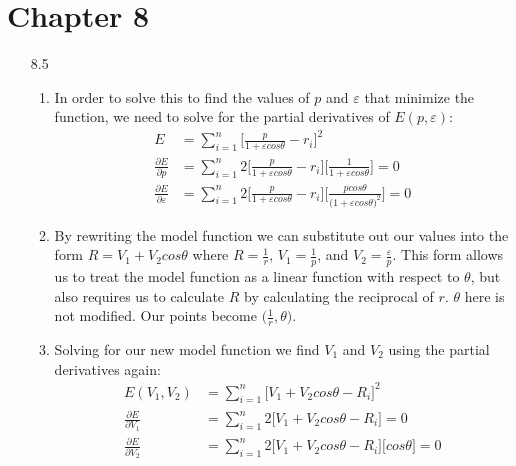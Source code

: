 \documentclass[11pt,a4paper]{article}
\begin{document}
	\section{Chapter 8}
		\begin{itemize}
			\item[8.5]
				\begin{enumerate} [label={\alph*)}]
					\item In order to solve this to find the values of $p$ and $\varepsilon$ that minimize the function, we need to solve for the partial derivatives of $E(p,\varepsilon)$:
					\begin{align*}
						E &= \sum\limits_{i=1}^n \Big[\frac{p}{1+\varepsilon cos \theta} - r_i\Big]^2 \\
						\frac{\partial E}{\partial p} &= \sum\limits_{i=1}^n 2\Big[\frac{p}{1+\varepsilon cos \theta} - r_i\Big]\Big[\frac{1}{1+\varepsilon cos \theta}\Big] = 0 \\
						\frac{\partial E}{\partial \varepsilon}&= \sum\limits_{i=1}^n 2\Big[\frac{p}{1+\varepsilon cos \theta} - r_i\Big]\Big[\frac{p cos\theta}{\big(1+\varepsilon cos \theta\big)^2}\Big] = 0
					\end{align*}
					
					\item By rewriting the model function we can substitute out our values into the form $R = V_1 + V_2cos\theta$ where $R = \frac{1}{r}$, $V_1 = \frac{1}{p}$, and $V_2 = \frac{\varepsilon}{p}$. This form allows us to treat the model function as a linear function with respect to $\theta$, but also requires us to calculate $R$ by calculating the reciprocal of $r$. $\theta$ here is not modified. Our points become $\big(\frac{1}{r},\theta\big)$.
					
					\item Solving for our new model function we find $V_1$ and $V_2$ using the partial derivatives again:
					\begin{align*}
						E(V_1,V_2) &= \sum\limits_{i=1}^n \Big[V_1 + V_2cos\theta - R_i\Big]^2 \\
						\frac{\partial E}{\partial V_1} &= \sum\limits_{i=1}^n 2\Big[V_1 + V_2cos\theta - R_i\Big] = 0\\
						\frac{\partial E}{\partial V_2} &= \sum\limits_{i=1}^n 2\Big[V_1 + V_2cos\theta - R_i\Big]\Big[cos\theta\Big] = 0
					\end{align*}
					

\end{enumerate}
\end{itemize}
\end{document}
